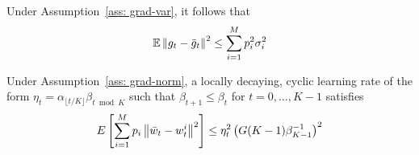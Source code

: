 \begin{lemma}
\label{lemma: full-variance}
    Under Assumption~\ref{ass: grad-var}, it follows that
    \begin{align*}
        \mathbb{E} \left\lVert g_t - \Bar{g}_t\right\rVert^2 \leq \sum_{i = 1}^M p_i^2 \sigma_i^2
    \end{align*}
\end{lemma}


\begin{lemma}
\label{lemma: full-divergence}
    Under Assumption~\ref{ass: grad-norm}, a locally decaying, cyclic learning rate of the form $\eta_t = \alpha_{\lfloor t/K \rfloor} \beta_{t \bmod K}$ such that $\beta_{t + 1} \leq \beta_t$ for $t = 0, \ldots, K - 1$ satisfies
    \begin{align*}
        E \left[ \sum_{i = 1}^M p_i \left\lVert\Bar{w}_t - w_t^i\right\rVert^2 \right] \leq \eta_t^2 \left( G (K - 1) \beta_{K - 1}^{-1}  \right)^2 
    \end{align*}
\end{lemma}
%
